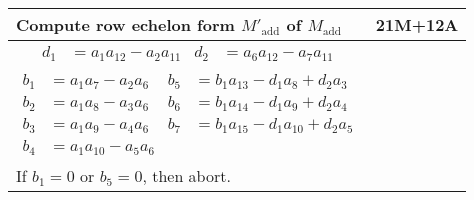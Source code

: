 \begin{tabularx}{\linewidth}{|Xr|}
  \hline
  Compute row echelon form $M'_{\text{add}}$ of $M_{\text{add}}$ & 21M+12A \\
  \hline
  {\begin{align*}
    d_1 &= a_1a_{12} - a_2a_{11} & d_2 &= a_6a_{12} - a_7a_{11} 
  \end{align*}} & \\
  {\begin{align*}
    b_1 &= a_1a_7    - a_2a_6 & b_5 &= b_1a_{13} - d_1a_8    + d_2a_3 \\
    b_2 &= a_1a_8    - a_3a_6 & b_6 &= b_1a_{14} - d_1a_9    + d_2a_4 \\
    b_3 &= a_1a_9    - a_4a_6 & b_7 &= b_1a_{15} - d_1a_{10} + d_2a_5 \\
    b_4 &= a_1a_{10} - a_5a_6
  \end{align*}} & \\
  If $b_1 =0$ or $b_5 = 0$, then abort. & \\
  \hline
\end{tabularx}


